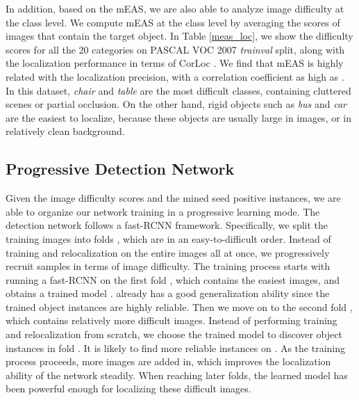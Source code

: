 \documentclass[10pt,twocolumn,letterpaper]{article}
\begin{document}
In addition, based on the mEAS, we are also able to analyze image difficulty at the class level. We compute mEAS at the class level by averaging the scores of images that contain the target object. In Table \ref{meas_loc}, we show the difficulty scores for all the 20 categories on PASCAL VOC 2007 \emph{trainval} split, along with the localization performance \cite{Bilen_2016_CVPR} in terms of CorLoc \cite{deselaers2012weakly}. We find that mEAS is highly related with the localization precision, with a correlation coefficient as high as . In this dataset,  \textit{chair} and \textit{table} are the most difficult classes, containing cluttered scenes or partial occlusion. On the other hand, rigid objects such as \textit{bus} and \textit{car} are the easiest to localize, because these objects are usually large in images, or in relatively clean background.

\subsection{Progressive Detection Network}
Given the image difficulty scores and the mined seed positive instances, we are able to organize our network training in a progressive learning mode. The  detection network follows a fast-RCNN \cite{girshick2015fast} framework. Specifically, we split the training images  into  folds , which are in an easy-to-difficult order. Instead of training and relocalization on the entire images all at once, we progressively recruit samples in terms of image difficulty. The training process starts with running a fast-RCNN on the first fold , which contains the easiest images, and obtains a trained model .  already has a good generalization ability since the trained object instances are highly reliable. Then we move on to the second fold , which contains relatively more difficult images. Instead of performing training and relocalization from scratch, we choose the trained model  to discover object instances in fold . It is likely to find more reliable instances on . As the training process proceeds, more images are added in, which improves the localization ability of the network steadily. When reaching later folds, the learned model has been powerful enough for localizing these difficult images.
\end{document}

